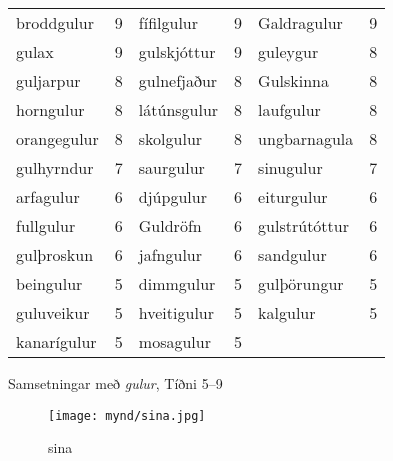 \documentclass[../samsetningasafn.tex]{subfiles}
\begin{document}
\begin{wordlist}[H]
\begin{tcolorbox}

	\setlength{\extrarowheight}{3pt}
	\begin{tabular}{BlBlBl}	
		broddgulur		& 9		& 	
		fífilgulur			& 9		& 
		Galdragulur		& 9		\\ 
		gulax			& 9		& 
		gulskjóttur		& 9		& 
		guleygur			& 8		\\ 
		guljarpur		& 8		& 
		gulnefjaður		& 8		& 	
		Gulskinna		& 8		\\ 
		horngulur		& 8		& 
		látúnsgulur		& 8		& 	
		laufgulur			& 8		\\ 
		orangegulur		& 8		& 
		skolgulur		& 8		& 	
		ungbarnagula	& 8		\\ 
		gulhyrndur		& 7		& 	
		saurgulur		& 7		& 
		sinugulur		& 7		\\ 
		arfagulur		& 6		& 
		djúpgulur		& 6		& 
		eiturgulur		& 6		\\ 
		fullgulur			& 6		& 
		Guldröfn			& 6		& 
		gulstrútóttur		& 6		\\ 
		gulþroskun		& 6		& 	
		jafngulur		& 6		& 
		sandgulur		& 6		\\ 
		beingulur		& 5		& 	
		dimmgulur		& 5		& 	
		gulþörungur		& 5		\\ 
		guluveikur		& 5		& 	
		hveitigulur		& 5		& 
		kalgulur			& 5		\\ 
		kanarígulur		& 5		& 	
		mosagulur		& 5		& 	
						&
	\end{tabular}

\end{tcolorbox}
	\caption{Samsetningar með \textit{gulur}, Tíðni 5--9}
	\label{listi:gult.5}
\end{wordlist}

\begin{figure}[H]
\begin{tcolorbox}
\centering
	\texttt{[image: mynd/sina.jpg]}
\end{tcolorbox}
	\caption{sina}
	\label{mynd:sina}
\end{figure}
\end{document}
